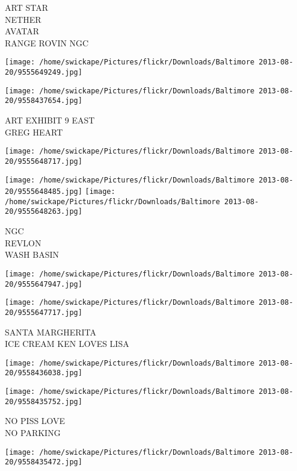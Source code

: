 \documentclass[10pt,letterpaper]{article}
\begin{document}
ART STAR\\
NETHER\\
AVATAR\\
RANGE ROVIN NGC\\
\pagebreak

\texttt{[image: /home/swickape/Pictures/flickr/Downloads/Baltimore 2013-08-20/9555649249.jpg]}

\vspace{0.25in}
\texttt{[image: /home/swickape/Pictures/flickr/Downloads/Baltimore 2013-08-20/9558437654.jpg]}

ART EXHIBIT 9 EAST\\
GREG HEART\\
\pagebreak

\texttt{[image: /home/swickape/Pictures/flickr/Downloads/Baltimore 2013-08-20/9555648717.jpg]}

\vspace{0.25in}
\texttt{[image: /home/swickape/Pictures/flickr/Downloads/Baltimore 2013-08-20/9555648485.jpg]}
\texttt{[image: /home/swickape/Pictures/flickr/Downloads/Baltimore 2013-08-20/9555648263.jpg]}

NGC\\
REVLON\\
WASH BASIN\\
\pagebreak

\texttt{[image: /home/swickape/Pictures/flickr/Downloads/Baltimore 2013-08-20/9555647947.jpg]}

\vspace{0.25in}
\texttt{[image: /home/swickape/Pictures/flickr/Downloads/Baltimore 2013-08-20/9555647717.jpg]}

SANTA MARGHERITA\\
ICE CREAM KEN LOVES LISA\\
\pagebreak

\texttt{[image: /home/swickape/Pictures/flickr/Downloads/Baltimore 2013-08-20/9558436038.jpg]}

\vspace{0.25in}
\texttt{[image: /home/swickape/Pictures/flickr/Downloads/Baltimore 2013-08-20/9558435752.jpg]}

NO PISS LOVE\\
NO PARKING\\
\pagebreak

\texttt{[image: /home/swickape/Pictures/flickr/Downloads/Baltimore 2013-08-20/9558435472.jpg]}
\end{document}
